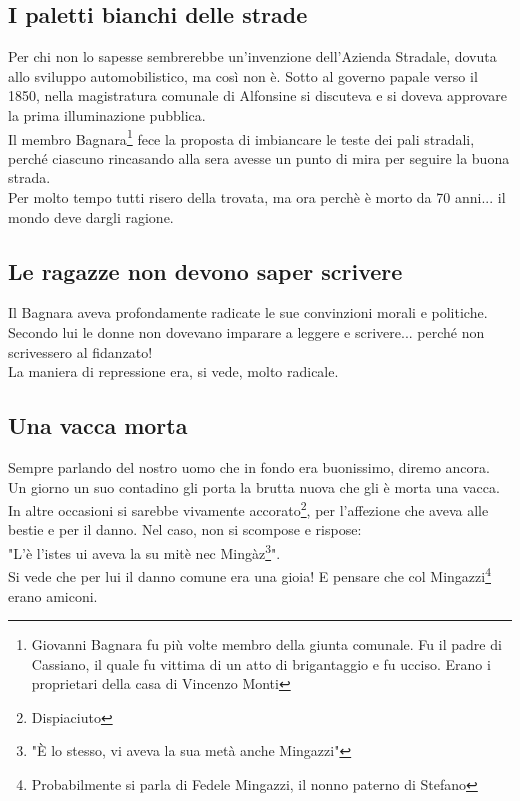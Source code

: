 \documentclass[10pt]{memoir} %
\begin{document}
\subsection{I paletti bianchi delle strade}
Per chi non lo sapesse sembrerebbe un'invenzione dell'Azienda Stradale, dovuta allo sviluppo automobilistico, ma così non è. Sotto al governo papale verso il 1850, nella magistratura comunale di Alfonsine si discuteva e si doveva approvare la prima illuminazione pubblica.\\
Il membro Bagnara\footnote{Giovanni Bagnara fu più volte membro della giunta comunale. Fu il padre di Cassiano, il quale fu vittima di un atto di brigantaggio e fu ucciso. Erano i proprietari della casa di Vincenzo Monti} fece la proposta di imbiancare le teste dei pali stradali, perché ciascuno rincasando alla sera avesse un punto di mira per seguire la buona strada.\\
Per molto tempo tutti risero della trovata, ma ora perchè è morto da 70 anni... il mondo deve dargli ragione.

\subsection{Le ragazze non devono saper scrivere}
Il Bagnara aveva profondamente radicate le sue convinzioni morali e politiche.\\
Secondo lui le donne non dovevano imparare a leggere e scrivere... perché non scrivessero al fidanzato!\\
La maniera di repressione era, si vede, molto radicale.\\

\subsection{Una vacca morta}
Sempre parlando del nostro uomo che in fondo era buonissimo, diremo ancora.\\
Un giorno un suo contadino gli porta la brutta nuova che gli è morta una vacca. In altre occasioni si sarebbe vivamente accorato\footnote{Dispiaciuto}, per l'affezione che aveva alle bestie e per il danno. Nel caso, non si scompose e rispose:\\
"L'è l'istes ui aveva la su mitè nec Mingàz\footnote{"È lo stesso, vi aveva la sua metà anche Mingazzi"}". \\
Si vede che per lui il danno comune era una gioia! E pensare che col Mingazzi\footnote{Probabilmente si parla di Fedele Mingazzi, il nonno paterno di Stefano} erano amiconi.
\end{document}
